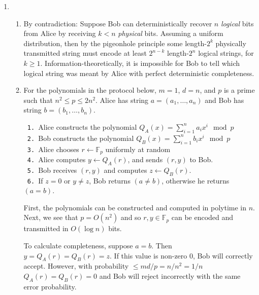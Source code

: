 \documentclass[12pt]{article}
\begin{document}
\begin{enumerate}
\item %

\begin{enumerate}

\item %
By contradiction: Suppose Bob can deterministically recover $n$
\textit{logical} bits from Alice by receiving $k < n$ \textit{physical}
bits. Assuming a uniform distribution, then by the pigeonhole principle
some length-$2^k$ physically transmitted string must encode at least
$2^{n-k}$ length-$2^n$ logical strings, for $k \ge 1$.
Information-theoretically, it is impossible for Bob to tell which
logical string was meant by Alice with perfect deterministic completeness.
 
\item %
For the polynomials in the protocol below, $m = 1$, $d = n$, and $p$ is a
prime such that $n^2 \le p \le 2n^2$. Alice has string $a = (a_1,\ldots,a_n)$
and Bob has string $b = (b_1,\ldots,b_n)$.

\verb+ 1. +Alice
 constructs the polynomial $Q_A(x) = \sum_{i=1}^n a_ix^i \mod p$\\
\verb+ 2. +Bob
 constructs the polynomial $Q_B(x) = \sum_{i=1}^n b_ix^i \mod p$\\
\verb+ 3. +Alice chooses $r \gets \mathbb{F}_p$ uniformly at random\\
\verb+ 4. +Alice computes $y \gets Q_A(r)$, and sends $(r,y)$ to Bob.\\
\verb+ 5. +Bob receives $(r,y)$ and computes $z \gets Q_B(r)$.\\
\verb+ 6. +If $z = 0$ or $y \ne z$, Bob returns $(a \ne b)$, otherwise
he returns $(a = b)$.

First, the polynomials can be constructed and computed in polytime in $n$.
Next, we see that $p = O(n^2)$ and so $r,y \in \mathbb{F}_p$ can be
encoded and transmitted in $O(\log n)$ bits.

To calculate completeness, suppose $a = b$. Then
$y = Q_A(r) = Q_B(r) = z$. If this value is non-zero 0,
Bob will correctly accept. However, with probability $ \le md/p = n/n^2 = 1/n$
$Q_A(r) = Q_B(r) = 0$ and Bob will reject incorrectly
with the same error probability.


\end{enumerate}
\end{enumerate}
\end{document}
